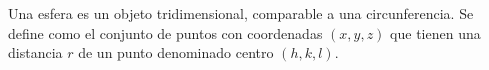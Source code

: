 Una esfera es un objeto tridimensional, comparable a una circunferencia. Se define como el conjunto de puntos con coordenadas ${\left(x,y,z\right)}$ que tienen una distancia ${r}$ de un punto denominado centro ${\left(h,k,l\right)}$.
